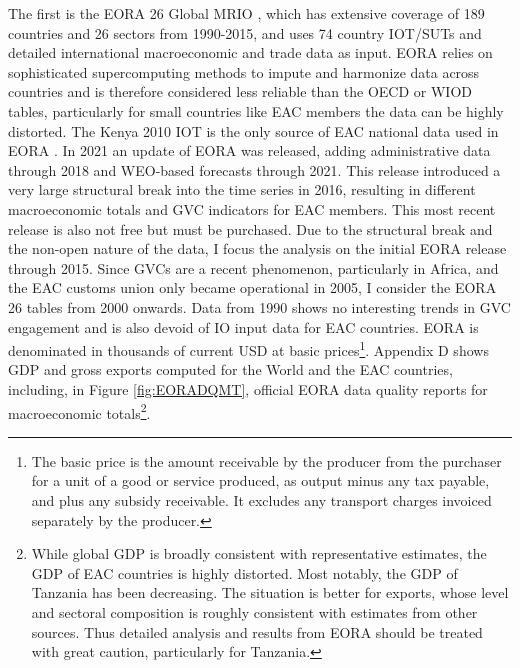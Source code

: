 \documentclass[a4paper]{article}
\begin{document}
 The first is the EORA 26 Global MRIO \citep{lenzen2012mapping, lenzen2013building}, which has extensive coverage of 189 countries and 26 sectors from 1990-2015, and uses 74 country IOT/SUTs and detailed international macroeconomic and trade data as input. EORA relies on sophisticated supercomputing methods to impute and harmonize data across countries and is therefore considered less reliable than the OECD or WIOD tables, particularly for small countries like EAC members the data can be highly distorted. The Kenya 2010 IOT is the only source of EAC national data used in EORA \citep{lenzen2013building}. In 2021 an update of EORA was released, adding administrative data through 2018 and WEO-based forecasts through 2021. This release introduced a very large structural break into the time series in 2016, resulting in different macroeconomic totals and GVC indicators for EAC members. %
This most recent release is also not free but must be purchased. Due to the structural break and the non-open nature of the data, I focus the analysis on the initial EORA release through 2015. Since GVCs are a recent phenomenon, particularly in Africa, and the EAC customs union only became operational in 2005, I consider the EORA 26 tables from 2000 onwards. Data from 1990 shows no interesting trends in GVC engagement and is also devoid of IO input data for EAC countries. %
EORA is denominated in thousands of current USD at basic prices\footnote{The basic price is the amount receivable by the producer from the purchaser for a unit of a good or service produced, as output minus any tax payable, and plus any subsidy receivable. It excludes any transport charges invoiced separately by the producer.}. %
Appendix D shows GDP and gross exports computed for the World and the EAC countries, including, in Figure \ref{fig:EORADQMT}, official EORA data quality reports for macroeconomic totals\footnote{While global GDP is broadly consistent with representative estimates, the GDP of EAC countries is highly distorted. Most notably, the GDP of Tanzania has been decreasing. The situation is better for exports, whose level and sectoral composition is roughly consistent with estimates from other sources. Thus detailed analysis and results from EORA should be treated with great caution, particularly for Tanzania.}. %
\end{document}
